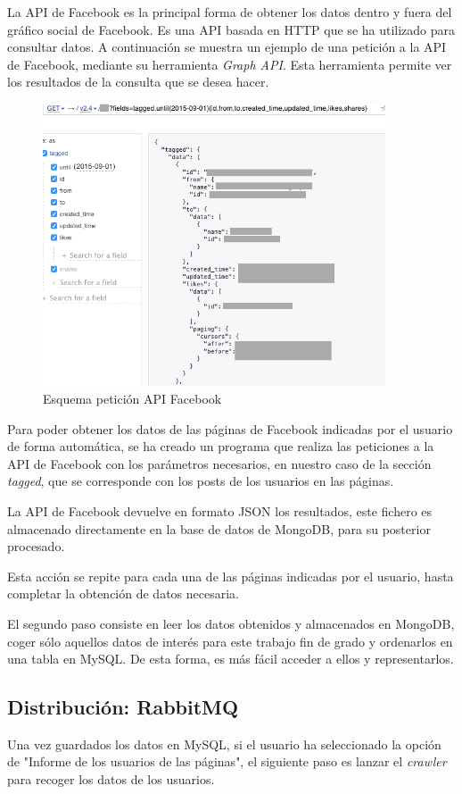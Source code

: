 La API de Facebook es la principal forma de obtener los datos dentro y fuera del gráfico social de Facebook. Es una API basada en HTTP que se ha utilizado para consultar datos. A continuación se muestra un ejemplo de una petición a la API de Facebook, mediante su herramienta \textit{Graph API}. Esta herramienta permite ver los resultados de la consulta que se desea hacer. 
\begin{figure}[H]
\centering
\includegraphics[width=4in]{figuras/ejemploAPI.png}
\caption{Esquema petición API Facebook} \label{fig:ejemploAPI}
\end{figure}

Para poder obtener los datos de las páginas de Facebook indicadas por el usuario de forma automática, se ha creado un programa que realiza las peticiones a la API de Facebook con los parámetros necesarios, en nuestro caso de la sección \textit{tagged}, que se corresponde con los posts de los usuarios en las páginas. 

La API de Facebook devuelve en formato JSON los resultados, este fichero es almacenado directamente en la base de datos de MongoDB, para su posterior procesado.

Esta acción se repite para cada una de las páginas indicadas por el usuario, hasta completar la obtención de datos necesaria. 

El segundo paso consiste en leer los datos obtenidos y almacenados en MongoDB, coger sólo aquellos datos de interés para este trabajo fin de grado y ordenarlos en una tabla en MySQL. De esta forma, es más fácil acceder a ellos y representarlos.

\subsection{Distribución: RabbitMQ}
Una vez guardados los datos en MySQL, si el usuario ha seleccionado la opción de "Informe de los usuarios de las páginas", el siguiente paso es lanzar el \textit{crawler} para recoger los datos de los usuarios. 

